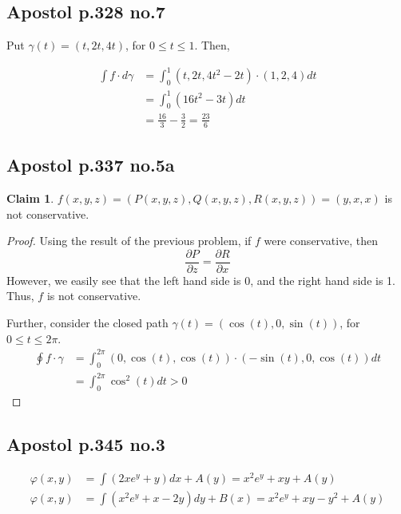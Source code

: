 \documentclass[12pt,letterpaper]{article}
\theoremstyle{definition}
\newtheorem*{claim}{Claim}
\begin{document}
\subsection*{Apostol p.328 no.7}

Put $\gamma(t) = (t, 2t, 4t)$, for $0 \leq t \leq 1$. Then,

\begin{align*}
  \int f \cdot d\gamma &= \int_0^1 (t, 2t, 4t^2 - 2t) \cdot (1,2,4)dt \\
                       &= \int_0^1 (16t^2 - 3t)dt \\
                       &= \frac{16}{3} - \frac{3}{2} = \frac{23}{6}
\end{align*}

\subsection*{Apostol p.337 no.5a}

\begin{claim}
  $f(x,y,z) = (P(x,y,z), Q(x,y,z), R(x,y,z)) = (y, x, x)$ is not conservative.
\end{claim}

\begin{proof}
  Using the result of the previous problem, if $f$ were conservative, then
  \[
    \frac{\partial P}{\partial z} = \frac{\partial R}{\partial x}
  \]
  However, we easily see that the left hand side is 0, and the right hand side
  is 1. Thus, $f$ is not conservative.

  Further, consider the closed path $\gamma(t) = (\cos(t), 0, \sin(t))$, for $0
  \leq t \leq 2\pi$.
  \begin{align*}
    \oint f \cdot \gamma &= \int_0^{2\pi} (0, \cos(t), \cos(t)) \cdot (-\sin(t), 0, \cos(t)) dt \\
                         &= \int_0^{2\pi} \cos^2(t)dt > 0
  \end{align*}
\end{proof}


\subsection*{Apostol p.345 no.3}

\begin{align*}
  \varphi(x,y) &= \int (2xe^y + y)dx + A(y) = x^2e^y + xy + A(y) \\
  \varphi(x,y) &= \int (x^2e^y + x - 2y)dy + B(x) = x^2e^y + xy - y^2 + A(y) \\
\end{align*}
\end{document}
